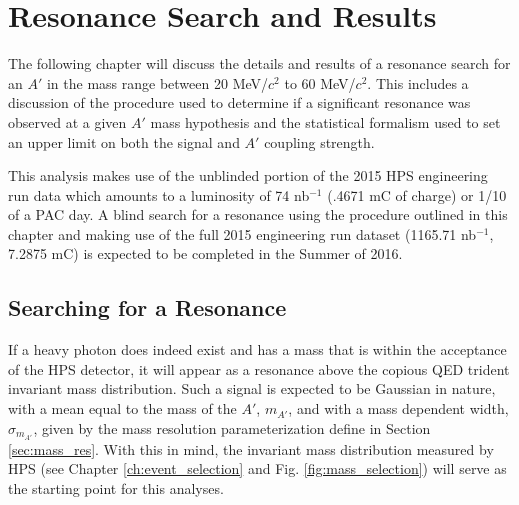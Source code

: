 
\chapter{Resonance Search and Results} \label{chap:resonance}

The following chapter will discuss the details and results of a resonance 
search for an $A'$ in the mass range between 20 MeV/$c^2$ to 60 MeV/$c^2$.
This includes a discussion of the procedure used to determine if a significant
resonance was observed at a given $A'$ mass hypothesis and the statistical
formalism used to set an upper limit on both the signal and $A'$ coupling
strength.

This analysis makes use of
the unblinded portion of the 2015 HPS engineering run data which amounts to 
a luminosity of 74 nb$^{-1}$ (.4671 mC of charge) or 1/10 of a PAC day.  
A blind search for a resonance using the procedure outlined in this chapter 
and making use of the full 2015 engineering run 
dataset (1165.71 nb$^{-1}$, 7.2875 mC) is expected to be completed in the 
Summer of 2016.

\section{Searching for a Resonance}

If a heavy photon does indeed exist and has a mass that is within the acceptance
of the HPS detector, it will appear as a resonance above the copious QED trident
invariant mass distribution.  Such a signal is expected to be Gaussian in 
nature, with a mean equal to the mass of the $A'$, $m_{A'}$, and with a mass
dependent width, $\sigma_{m_{A'}}$, given by the mass resolution 
parameterization define in Section \ref{sec:mass_res}. With this in mind, the 
invariant mass distribution measured by HPS (see Chapter 
\ref{ch:event_selection} and Fig. \ref{fig:mass_selection}) will serve as the
starting point for this analyses. 


